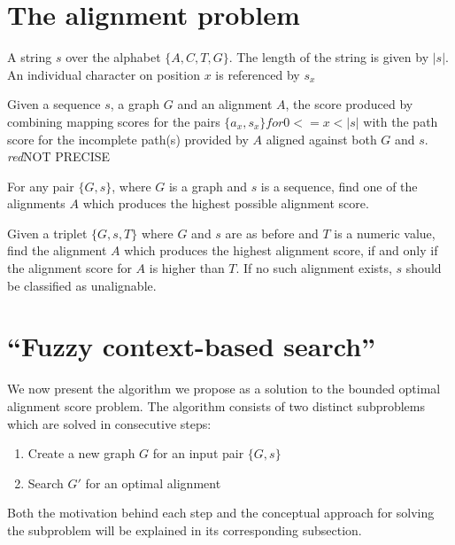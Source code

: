 \documentclass[thesis.tex]{subfiles}
\begin{document}
\section{The alignment problem}
\begin{defn}
  A string $s$ over the alphabet $\{A, C, T, G\}$. The length of the string is given by $|s|$. An individual character on position $x$ is referenced by $s_x$
\end{defn}
\begin{defn}
  Given a sequence $s$, a graph $G$ and an alignment $A$, the score produced by combining mapping scores for the pairs $\{a_x, s_x\} for 0<=x<|s|$ with the path score for the incomplete path(s) provided by $A$ aligned against both $G$ and $s$. \textit{red}{NOT PRECISE}
\end{defn}
\begin{defn}
  For any pair $\{G, s\}$, where $G$ is a graph and $s$ is a sequence, find one of the alignments $A$ which produces the highest possible alignment score.
\end{defn}
\begin{defn}
  \label{def:bounded_alignment_problem}
  Given a triplet $\{G, s, T\}$ where $G$ and $s$ are as before and $T$ is a numeric value, find the alignment $A$ which produces the highest alignment score, if and only if the alignment score for $A$ is higher than $T$. If no such alignment exists, $s$ should be classified as unalignable.
\end{defn}
\section{``Fuzzy context-based search''}
We now present the algorithm we propose as a solution to the bounded optimal alignment score problem. The algorithm consists of two distinct subproblems which are solved in consecutive steps:
\begin{enumerate}
  \item Create a new graph $G$ for an input pair $\{G, s\}$
  \item Search $G'$ for an optimal alignment
\end{enumerate}
Both the motivation behind each step and the conceptual approach for solving the subproblem will be explained in its corresponding subsection.
\end{document}

